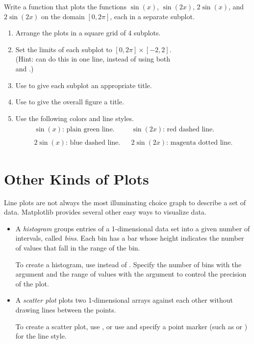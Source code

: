 \begin{problem} %
Write a function that plots the functions $\sin(x)$, $\sin(2x)$, $2\sin(x)$, and $2\sin(2x)$ on the domain $[0, 2\pi]$, each in a separate subplot.
\begin{enumerate}
    \item Arrange the plots in a square grid of 4 subplots.
    \item Set the limits of each subplot to $[0, 2\pi]\times[-2,2]$.
    \\(Hint:  can do this in one line, instead of using both
    \\ and .)
    \item Use  to give each subplot an appropriate title.
    \item Use  to give the overall figure a title.
    \item Use the following colors and line styles.
    \begin{align*}\begin{array}{rcl}
    \sin(x)\text{: plain green line.} && \sin(2x)\text{: red dashed line.}\\ \\
    2\sin(x)\text{: blue dashed line.} && 2\sin(2x)\text{: magenta dotted line.}
    \end{array}\end{align*}
\end{enumerate}
\end{problem}

\section*{Other Kinds of Plots} %

Line plots are not always the most illuminating choice graph to describe a set of data.
Matplotlib provides several other easy ways to visualize data.

\begin{itemize}
\item A \emph{histogram} groups entries of a 1-dimensional data set into a given number of intervals, called \emph{bins}.
Each bin has a bar whose height indicates the number of values that fall in the range of the bin.

To create a histogram, use  instead of .
Specify the number of bins with the argument  and the range of values with the argument  to control the precision of the plot.

\item A \emph{scatter plot} plots two 1-dimensional arrays against each other without drawing lines between the points.

To create a scatter plot, use , or use  and specify a point marker (such as  or ) for the line style.
\end{itemize}


